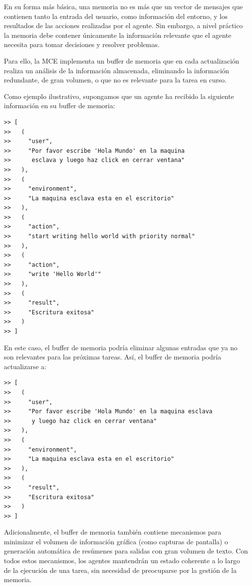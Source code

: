 En su forma más básica, una memoria no es más que un vector de mensajes que 
contienen tanto la entrada del usuario, como información del entorno,
y los resultados de las acciones realizadas por el agente. Sin embargo,
a nivel práctico la memoria debe contener únicamente la información relevante
que el agente necesita para tomar decisiones y resolver problemas.

Para ello, la MCE implementa un buffer de memoria que en cada actualización
realiza un análisis de la información almacenada, eliminando la información 
redundante, de gran volumen, o que no es relevante para la tarea en curso.

Como ejemplo ilustrativo, supongamos que un agente ha recibido la siguiente
información en su buffer de memoria:

\begin{lstlisting}[caption={Buffer de memoria}, label={cod:memory_buffer_example}]
>> [
>>   (
>>     "user",
>>     "Por favor escribe 'Hola Mundo' en la maquina 
>>      esclava y luego haz click en cerrar ventana"
>>   ),
>>   (
>>     "environment",
>>     "La maquina esclava esta en el escritorio"
>>   ),
>>   (
>>     "action",
>>     "start writing hello world with priority normal"
>>   ),
>>   (
>>     "action",
>>     "write 'Hello World'"
>>   ),
>>   (
>>     "result",
>>     "Escritura exitosa"
>>   )
>> ]
\end{lstlisting}

En este caso, el buffer de memoria podría eliminar algunas entradas que
ya no son relevantes para las próximas tareas. Así, el buffer de memoria
podría actualizarse a:

\begin{lstlisting}[caption={Buffer de memoria actualizado}, label={cod:memory_buffer_updated_example}]
>> [
>>   (
>>     "user",
>>     "Por favor escribe 'Hola Mundo' en la maquina esclava 
>>      y luego haz click en cerrar ventana"
>>   ),
>>   (
>>     "environment",
>>     "La maquina esclava esta en el escritorio"
>>   ),
>>   (
>>     "result",
>>     "Escritura exitosa"
>>   )
>> ]
\end{lstlisting}

Adicionalmente, el buffer de memoria también contiene mecanismos para minimizar
el volumen de información gráfica (como capturas de pantalla) o generación automática
de resúmenes para salidas con gran volumen de texto. Con todos estos mecanismos,
los agentes mantendrán un estado coherente a lo largo de la ejecución de una tarea,
sin necesidad de preocuparse por la gestión de la memoria.

